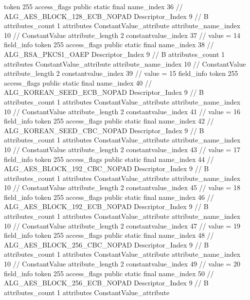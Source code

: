 {{{{{				token	255
				access_flags	public static final
				name_index	36		// ALG_AES_BLOCK_128_ECB_NOPAD
				Descriptor_Index	9		// B
				attributes_count	1
				attributes {
				ConstantValue_attribute {
					attribute_name_index	10		// ConstantValue
					attribute_length	2
					constantvalue_index	37		// value = 14
				}
				}
			}
			field_info {
				token	255
				access_flags	public static final
				name_index	38		// ALG_RSA_PKCS1_OAEP
				Descriptor_Index	9		// B
				attributes_count	1
				attributes {
				ConstantValue_attribute {
					attribute_name_index	10		// ConstantValue
					attribute_length	2
					constantvalue_index	39		// value = 15
				}
				}
			}
			field_info {
				token	255
				access_flags	public static final
				name_index	40		// ALG_KOREAN_SEED_ECB_NOPAD
				Descriptor_Index	9		// B
				attributes_count	1
				attributes {
				ConstantValue_attribute {
					attribute_name_index	10		// ConstantValue
					attribute_length	2
					constantvalue_index	41		// value = 16
				}
				}
			}
			field_info {
				token	255
				access_flags	public static final
				name_index	42		// ALG_KOREAN_SEED_CBC_NOPAD
				Descriptor_Index	9		// B
				attributes_count	1
				attributes {
				ConstantValue_attribute {
					attribute_name_index	10		// ConstantValue
					attribute_length	2
					constantvalue_index	43		// value = 17
				}
				}
			}
			field_info {
				token	255
				access_flags	public static final
				name_index	44		// ALG_AES_BLOCK_192_CBC_NOPAD
				Descriptor_Index	9		// B
				attributes_count	1
				attributes {
				ConstantValue_attribute {
					attribute_name_index	10		// ConstantValue
					attribute_length	2
					constantvalue_index	45		// value = 18
				}
				}
			}
			field_info {
				token	255
				access_flags	public static final
				name_index	46		// ALG_AES_BLOCK_192_ECB_NOPAD
				Descriptor_Index	9		// B
				attributes_count	1
				attributes {
				ConstantValue_attribute {
					attribute_name_index	10		// ConstantValue
					attribute_length	2
					constantvalue_index	47		// value = 19
				}
				}
			}
			field_info {
				token	255
				access_flags	public static final
				name_index	48		// ALG_AES_BLOCK_256_CBC_NOPAD
				Descriptor_Index	9		// B
				attributes_count	1
				attributes {
				ConstantValue_attribute {
					attribute_name_index	10		// ConstantValue
					attribute_length	2
					constantvalue_index	49		// value = 20
				}
				}
			}
			field_info {
				token	255
				access_flags	public static final
				name_index	50		// ALG_AES_BLOCK_256_ECB_NOPAD
				Descriptor_Index	9		// B
				attributes_count	1
				attributes {
				ConstantValue_attribute {
}}}}}}}
